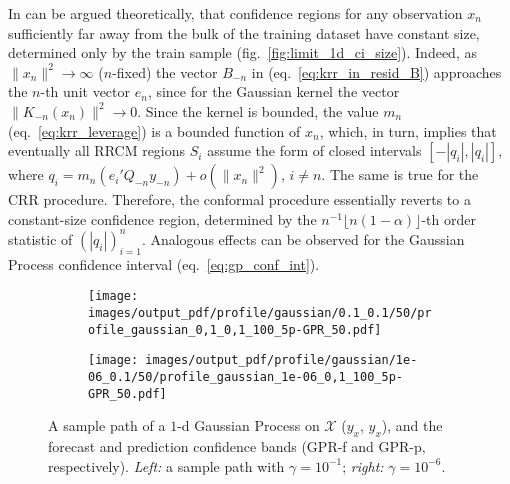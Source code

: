 \documentclass[a4paper,14pt]{extarticle}
\newcommand{\Xcal}{\mathcal{X}}
\newcommand{\Real}{\mathbb{R}}
\begin{document}
In can be argued theoretically, that confidence regions for any observation $x_n$
sufficiently far away from the bulk of the training dataset have constant size,
determined only by the train sample (fig.~\ref{fig:limit_1d_ci_size}). Indeed, as
$\|x_n\|^2\to \infty$ ($n$-fixed) the vector $B_{-n}$ in (eq.~\ref{eq:krr_in_resid_B})
approaches the $n$-th unit vector $e_n$, since for the Gaussian kernel the vector
$\|K_{-n}(x_n)\|^2\to 0$. Since the kernel is bounded, the value $m_n$ (eq.~\ref{eq:krr_leverage})
is a bounded function of $x_n$, which, in turn, implies that eventually all RRCM
regions $S_i$ assume the form of closed intervals $[-|q_i|, |q_i|]$, where
$q_i = m_n (e_i'Q_{-n}y_{-n}) + o(\|x_n\|^2)$, $i \neq n$. The same is true for
the CRR procedure. Therefore, the conformal procedure essentially reverts to a
constant-size confidence region, determined by the  $n^{-1}\lfloor n(1-\alpha)\rfloor$-th
order statistic of $(|q_i|)_{i=1}^n$. Analogous effects can be observed for the
Gaussian Process confidence interval (eq.~\ref{eq:gp_conf_int}).
\begin{figure}%
  \centering
  \begin{subfigure}[b]{0.5\linewidth}
    \texttt{[image: images/output\_pdf/profile/gaussian/0.1\_0.1/50/profile\_gaussian\_0,1\_0,1\_100\_5p-GPR\_50.pdf]}
  \end{subfigure}%
  \begin{subfigure}[b]{0.5\linewidth}
    \texttt{[image: images/output\_pdf/profile/gaussian/1e-06\_0.1/50/profile\_gaussian\_1e-06\_0,1\_100\_5p-GPR\_50.pdf]}
  \end{subfigure}%
  \caption{A sample path of a $1$-d Gaussian Process on $\Xcal$ ($y_x$,  $\hat{y}_x$),
  and the forecast and prediction confidence bands (GPR-f and GPR-p, respectively).
  \textit{Left:} a sample path with $\gamma=10^{-1}$; \textit{right:} $\gamma=10^{-6}$.}
  \label{fig:gauss_1d_prof_gpr}
\end{figure}
\end{document}
